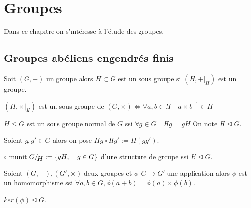 
\chapter{Groupes}
\label{cha:groupes}

Dans ce chapitre on s'intéresse à l'étude des groupes.

\section{Groupes abéliens engendrés finis}

 \begin{definition}
    \label{def:49}
    Soit $(G,+)$ un groupe alors $H\subset G$ est un sous groupe si $(H,+|_{ H })$ est un groupe.
 \end{definition}
 
 \begin{lemma}
    \label{lem:23}
    $(H,\times|_H)$ est un sous groupe de $(G,\times) \Leftrightarrow \forall a,b \in H\quad a\times b^{-1} \in H$
   \end{lemma}
   
    \begin{definition}
    \label{def:49}
    $H\le G$ est un sous groupe normal de $G$ ssi $\forall g \in G\quad Hg=gH$ On note $H\unlhd G$.
     \end{definition}
     
      \begin{definition}
    \label{def:49}
    Soient $g,g' \in G$ alors on pose $Hg \circ Hg' := H(gg')$.
     \end{definition}
     
     \begin{theorem}
    \label{thr:28}
    $\circ$  munit $G/\!\raisebox{-.65ex}{\ensuremath{{H}}}  := \left\{ gH,\quad g\in G \right\}$ d'une structure de groupe ssi $H\unlhd G$.
    \end{theorem}
    
       \begin{definition}
    \label{def:49}
    Soient $(G,+),(G',\times)$ deux groupes et $\phi :G\rightarrow G'$ une application alors $\phi$ est un homomorphisme ssi 
    $\forall a,b \in G, \phi(a+b)=\phi(a) \times \phi(b)$.
    \end{definition}
    
    \begin{remark}
    $ker(\phi) \unlhd G$.
    \end{remark}
    
